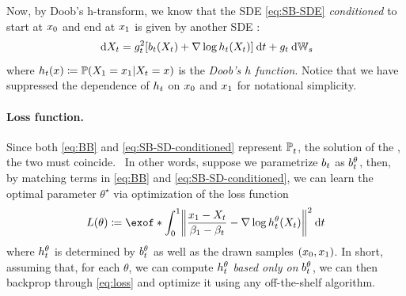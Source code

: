 Now, by Doob's h-transform, we know that the \acrshort{SDE} \eqref{eq:SB-SDE} \emph{conditioned} to start at $x_0$ and end at $x_1$ is given by another \acrshort{SDE}  \citep{doob1984classical,rogers2000diffusions}:
\begin{equation}
\label{eq:SB-SD-conditioned}
\dd X_t = \volatsq[\ctime]\bracks*{\fdrift(X_t) + \nabla \log \doob(X_t) }\dt +\volat \dWiener
\end{equation}
where $h_t(x) \coloneqq \operatorname{\mathbb{P}}(X_1 = x_1\vert X_t = x)$ is the \emph{Doob's $h$ function}. Notice that we have suppressed the dependence of $h_t$ on $x_0$ and $x_1$ for notational simplicity. %



\paragraph{Loss function.}

Since both \eqref{eq:BB} and \eqref{eq:SB-SD-conditioned} represent $\mathbb{P}^{}_{ t }$, the solution of the , the two  must coincide. 
~In other words, suppose we parametrize $b_t$ as $b_t^\theta$, then, by matching terms in \eqref{eq:BB} and \eqref{eq:SB-SD-conditioned}, we can learn the optimal parameter $\theta^\star$ via optimization of the loss function
\begin{equation}
\label{eq:loss}
\Loss(\theta) \defeq \exof*{\int_0^1 \norm*{ \frac{\x_1-X_t}{\cvolat[\horizon]-\cvolat[\ctime]}-\nabla \log \doob^\theta(X_t)}^2 \dt  }
\end{equation}where $h_t^\theta$ is determined by $b_t^\theta$ as well as the drawn samples $(x_0,x_1)$. In short, assuming that, for each $\theta$, we can compute $h_t^\theta$ \emph{based only on} $b_t^\theta$, we can then backprop through \eqref{eq:loss} and optimize it using any off-the-shelf algorithm.


